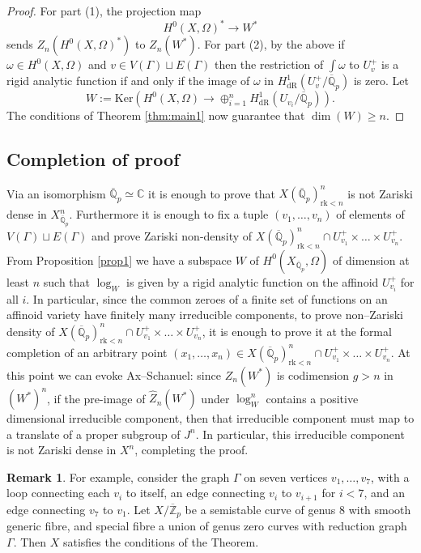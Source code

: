 \documentclass{amsart}
\def\Z{\mathbb Z}
\def\Q{\mathbb Q}
\def\C{\mathbb C}
\newcommand{\dR}{\mathrm{dR}}
\newcommand{\rk}{\mathrm{rk}}
\theoremstyle{plain}
\theoremstyle{definition}
\newtheorem{remark}{Remark}
\newcommand{\Ker}{\mathrm{Ker}}
\begin{document}
\begin{proof}
For part (1), the projection map
\[
H^0 (X,\Omega )^* \to W^*
\]
sends $Z_n (H^0 (X,\Omega )^* )$ to $Z_n (W^* )$. For part (2), by the above if $\omega \in H^0 (X,\Omega )$ and $v\in V(\Gamma )\sqcup E(\Gamma )$ then the restriction of $\int \omega $ to $U_v ^+$ is a rigid analytic function if and only if the image of $\omega $ in $H^1 _{\dR}(U_v ^+ /\overline{\Q }_p )$ is zero. Let 
\[
W:=\Ker (H^0 (X,\Omega )\to \oplus _{i=1}^n H^1 _{\dR}(U_{v_i }/\overline{\Q }_p )).
\]
The conditions of Theorem \ref{thm:main1} now guarantee that $\dim (W)\geq n$.
\end{proof}
\subsection{Completion of proof}
Via an isomorphism $\overline{\Q }_p \simeq \C$ it is enough to prove that $X(\overline{\Q }_p )^n _{\rk <n}$ is not Zariski dense in $X^n _{\overline{\Q }_p }$. Furthermore it is enough to fix a tuple $(v_1 ,\ldots,v_n )$ of elements of $V(\Gamma )\sqcup E(\Gamma )$ and prove Zariski non-density of $X(\overline{\Q }_p )^n _{\rk <n} \cap U_{v_1 }^+ \times \ldots \times U_{v_n }^+ $. From Proposition \ref{prop1} we have a subspace $W$ of $H^0 (X_{\overline{\Q }_p },\Omega )$ of dimension at least $n$ such that $\log _W $ is given by a rigid analytic function on the affinoid $U_{v _i }^+ $ for all $i$. In particular, since the common zeroes of a finite set of functions on an affinoid variety have finitely many irreducible components, to prove non--Zariski density of $X(\overline{\Q } _p )^n _{\rk <n}\cap U_{v_1 }^+ \times \ldots \times U_{v_n }^+$, it is enough to prove it at the formal completion of an arbitrary point $(x_1 ,\ldots ,x_n )\in X(\overline{\Q } _p )^n _{\rk <n}\cap U_{v_1 }^+ \times \ldots \times U_{v_n }^+$. At this point we can evoke Ax--Schanuel: since $Z_n (W^* )$ is codimension $g>n$ in $(W^* )^n $, if the pre-image of $\widehat{Z}_n (W^* )$ under $\log _W ^n $ contains a positive dimensional irreducible component, then that irreducible component must map to a translate of a proper subgroup of $J^n $. In particular, this irreducible component is not Zariski dense in $X^n $, completing the proof.

\begin{remark}\label{rmk:example}
For example, consider the graph $\Gamma $ on seven vertices $v_1 ,\ldots ,v_7$, with a loop connecting each $v_i$ to itself, an edge connecting $v_i$ to $v_{i+1}$ for $i<7$, and an edge connecting $v_7$ to $v_1$. Let $X/\overline{\Z }_p $ be a semistable curve of genus $8$ with smooth generic fibre, and special fibre a union of genus zero curves with reduction graph $\Gamma $. Then $X$ satisfies the conditions of the Theorem.
\end{remark}
\end{document}
